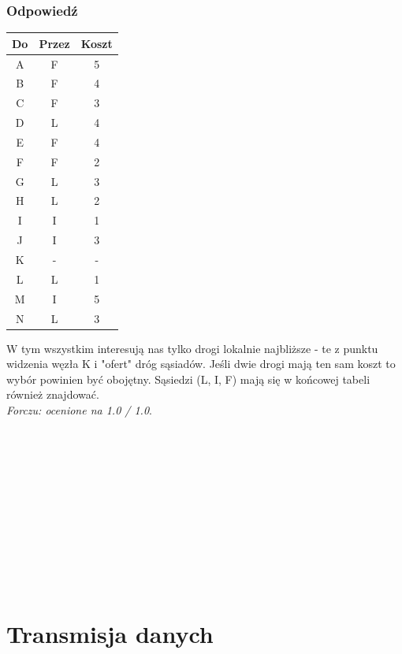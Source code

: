 \documentclass[a4paper,twoside]{article}
\begin{document}
\subsubsection{Odpowiedź}
\begin{table}
	\begin{tabular}{c|c|c}
		Do & Przez & Koszt \\ \hline
		A  & F     & 5     \\
		B  & F     & 4     \\
		C  & F     & 3     \\
		D  & L     & 4     \\
		E  & F     & 4     \\
		F  & F     & 2     \\
		G  & L     & 3     \\
		H  & L     & 2     \\
		I  & I     & 1     \\
		J  & I     & 3     \\
		K  & -     & -     \\
		L  & L     & 1     \\
		M  & I     & 5     \\
		N  & L     & 3    
	\end{tabular}
\end{table}
W tym wszystkim interesują nas tylko drogi lokalnie najbliższe - te z punktu widzenia węzła K i "ofert" dróg sąsiadów. Jeśli dwie drogi mają ten sam koszt to wybór powinien być obojętny. Sąsiedzi (L, I, F) mają się w końcowej tabeli również znajdować.\\
\small{ \emph{Forczu: ocenione na 1.0 / 1.0}}.\\\\\\\\\\\\\\\\\\\\\\\\

\newpage
\section{Transmisja danych}
\end{document}

